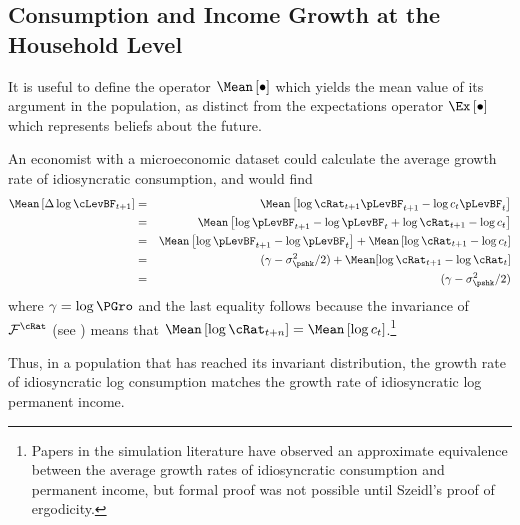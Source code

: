 \documentclass[titlepage]{\econtex}\providecommand{\texname}{BufferStockTheory}%
\begin{document}
\subsection{Consumption and Income Growth at the Household Level}

It is useful to define the operator $\Mean\left[\bullet\right]$
which yields the mean value of its argument in the population, as
distinct from the expectations operator $\Ex\left[\bullet\right]$ which represents beliefs about the
future.

An economist with a microeconomic dataset could calculate the average
growth rate of idiosyncratic consumption, and would find
\begin{eqnarray*}
\Mean\left[\Delta \log \cLevBF_{t+1}\right] & = & \Mean\left[ \log {\cRat}%
_{t+1}\pLevBF_{t+1} - \log c_{t}\pLevBF_{t}\right]  \notag \\
& = & \Mean\left[ \log \pLevBF_{t+1}- \log \pLevBF_{t} + \log {\cRat}_{t+1} - \log c_{t}\right]  \notag \\
& = & \Mean\left[ \log \pLevBF_{t+1}- \log \pLevBF_{t}\right] + \Mean\left[ \log {\cRat}_{t+1} - \log c_{t}\right]  \notag \\
& = & (\gamma - \sigma^{2}_{\pshk}/2) + \Mean[\log \cRat_{t+1} - \log \cRat_{t}] \\
& = & (\gamma - \sigma^{2}_{\pshk}/2)
\end{eqnarray*}
where $\gamma=\log \PGro$ and the last equality follows because the invariance of
$\mathcal{F}^{\cRat}$ (see \cite{szeidlInvariant}) means that $\Mean\left[ \log
  {\cRat}_{t+n}\right] = \Mean\left[ \log
  c_{t}\right]$.\footnote{Papers in the simulation literature have
  observed an approximate equivalence between the average growth rates
  of idiosyncratic consumption and permanent income, but formal proof
  was not possible until Szeidl's proof of ergodicity.}

Thus, in a population that has reached its invariant distribution, the growth
rate of idiosyncratic log consumption matches the growth rate of idiosyncratic log permanent income.
\end{document}
